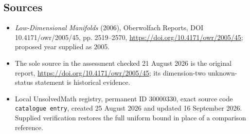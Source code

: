 \documentclass[11pt]{article}
\begin{document}
\subsection{Sources}
\begin{itemize}
\item \emph{Low-Dimensional Manifolds} (2006), Oberwolfach Reports, DOI 10.4171/owr/2005/45, pp. 2519--2570, \url{https://doi.org/10.4171/owr/2005/45}; proposed year supplied as 2005.
\item The sole source in the assessment checked 21 August 2026 is the original report, \url{https://doi.org/10.4171/owr/2005/45}; its dimension-two unknown-status statement is historical evidence.
\item Local UnsolvedMath registry, permanent ID $30000330$, exact source code \texttt{catalogue entry}, created 25 August 2026 and updated 16 September 2026. Supplied verification restores the full uniform bound in place of a comparison reference.
\end{itemize}
\end{document}
